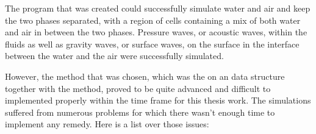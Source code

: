 
The program that was created could successfully simulate water and air and keep the two phases separated, with a region of cells containing a mix of both water and air in between the two phases. Pressure waves, or acoustic waves, within the fluids as well as gravity waves, or surface waves, on the surface in the interface between the water and the air were successfully simulated.


However, the method that was chosen, which was the \FVM on an \octree data structure together with the \VOF method, proved to be quite advanced and difficult to implemented properly within the time frame for this thesis work. The simulations suffered from numerous problems for which there wasn't enough time to implement any remedy. Here is a list over those issues:


